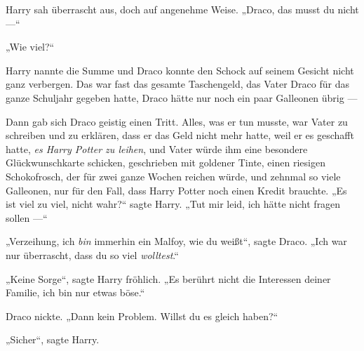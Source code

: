 Harry sah überrascht aus, doch auf angenehme Weise.
„Draco, das musst du nicht —“

„Wie viel?“

Harry nannte die Summe und Draco konnte den Schock auf seinem Gesicht nicht ganz verbergen. Das war fast das gesamte Taschengeld, das Vater Draco für das ganze Schuljahr gegeben hatte, Draco hätte nur noch ein paar Galleonen übrig —

Dann gab sich Draco geistig einen Tritt. Alles, was er tun musste, war Vater zu schreiben und zu erklären, dass er das Geld nicht mehr hatte, weil er es geschafft hatte, \emph{es Harry Potter zu leihen}, und Vater würde ihm eine besondere Glückwunschkarte schicken, geschrieben mit goldener Tinte, einen riesigen Schokofrosch, der für zwei ganze Wochen reichen würde, und zehnmal so viele Galleonen, nur für den Fall, dass Harry Potter noch einen Kredit brauchte.
„Es ist viel zu viel, nicht wahr?“ sagte Harry.
„Tut mir leid, ich hätte nicht fragen sollen —“

„Verzeihung, ich \emph{bin} immerhin ein Malfoy, wie du weißt“, sagte Draco.
„Ich war nur überrascht, dass du so viel \emph{wolltest}.“

„Keine Sorge“, sagte Harry fröhlich.
„Es berührt nicht die Interessen deiner Familie, ich bin nur etwas böse.“

Draco nickte.
„Dann kein Problem. Willst du es gleich haben?“

„Sicher“, sagte Harry.

